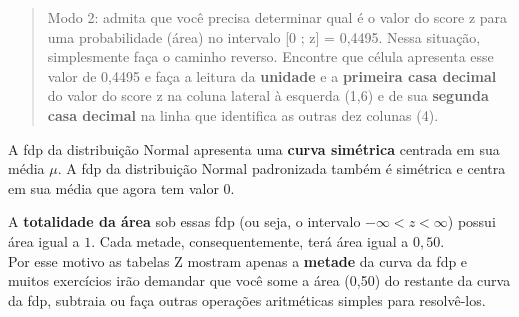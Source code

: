 \documentclass[
]{book}
\begin{document}
\begin{quote}
Modo 2: admita que você precisa determinar qual é o valor do score z para uma probabilidade (área) no intervalo {[}0 ; z{]} = 0,4495. Nessa situação, simplesmente faça o caminho reverso.
Encontre que célula apresenta esse valor de 0,4495 e faça a leitura da \textbf{unidade} e a \textbf{primeira casa decimal} do valor do score z na coluna lateral à esquerda (1,6) e de sua \textbf{segunda casa decimal} na linha que identifica as outras dez colunas (4).
\end{quote}

\hfill\break

A fdp da distribuição Normal apresenta uma \textbf{curva simétrica} centrada em sua média \(\mu\). A fdp da distribuição Normal padronizada também é simétrica e centra em sua média que agora tem valor \(0\).

\hfill\break

A \textbf{totalidade da área} sob essas fdp (ou seja, o intervalo \(-\infty < z < \infty\)) possui área igual a \(1\). Cada metade, consequentemente, terá área igual a \(0,50\).\\

Por esse motivo as tabelas Z mostram apenas a \textbf{metade} da curva da fdp e muitos exercícios irão demandar que você some a área (0,50) do restante da curva da fdp, subtraia ou faça outras operações aritméticas simples para resolvê-los.

\hfill\break
\end{document}
